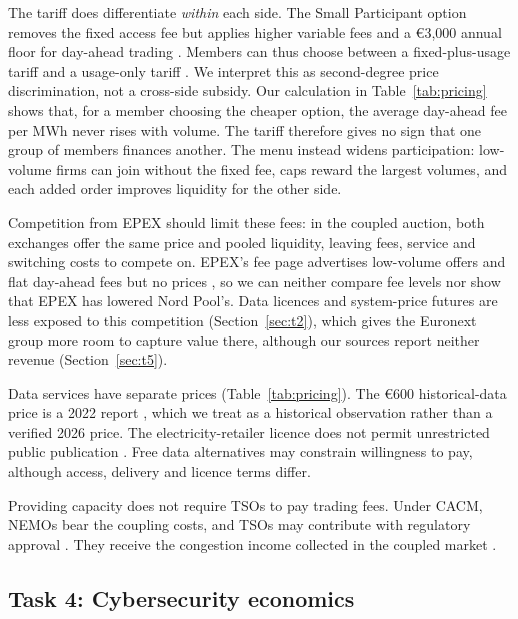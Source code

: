The tariff does differentiate \emph{within} each side. The Small Participant option removes the fixed access fee but applies higher variable fees and a €3,000 annual floor for day-ahead trading \citep{NPFees2026}. Members can thus choose between a fixed-plus-usage tariff and a usage-only tariff \citep[Section~10.2.2]{OverbyAudestad2021}. We interpret this as second-degree price discrimination, not a cross-side subsidy. Our calculation in Table~\ref{tab:pricing} shows that, for a member choosing the cheaper option, the average day-ahead fee per MWh never rises with volume. The tariff therefore gives no sign that one group of members finances another. The menu instead widens participation: low-volume firms can join without the fixed fee, caps reward the largest volumes, and each added order improves liquidity for the other side.

Competition from EPEX should limit these fees: in the coupled auction, both exchanges offer the same price and pooled liquidity, leaving fees, service and switching costs to compete on. EPEX's fee page advertises low-volume offers and flat day-ahead fees but no prices \citep{EPEXFees}, so we can neither compare fee levels nor show that EPEX has lowered Nord Pool's. Data licences and system-price futures are less exposed to this competition (Section~\ref{sec:t2}), which gives the Euronext group more room to capture value there, although our sources report neither revenue (Section~\ref{sec:t5}).

Data services have separate prices (Table~\ref{tab:pricing}). The €600 historical-data price is a 2022 report \citep{ERR2022}, which we treat as a historical observation rather than a verified 2026 price. The electricity-retailer licence does not permit unrestricted public publication \citep{NPData}. Free data alternatives may constrain willingness to pay, although access, delivery and licence terms differ.

Providing capacity does not require TSOs to pay trading fees. Under CACM, NEMOs bear the coupling costs, and TSOs may contribute with regulatory approval \citep[Article~76]{CACM2015}. They receive the congestion income collected in the coupled market \citep[Article~68]{CACM2015}.
\subsection{Task 4: Cybersecurity economics}
\label{sec:t4}


